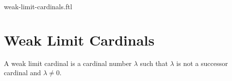 \documentclass{naproche-library}
\begin{document}
\begin{smodule}{weak-limit-cardinals.ftl}

  \section*{Weak Limit Cardinals}

  \begin{definition}[forthel,id=SET_THEORY_06_8945210236547450]
    A weak limit cardinal is a cardinal number $\lambda$ such that $\lambda$ is not a successor cardinal and $\lambda \neq 0$.
  \end{definition}
\end{smodule}
\end{document}
